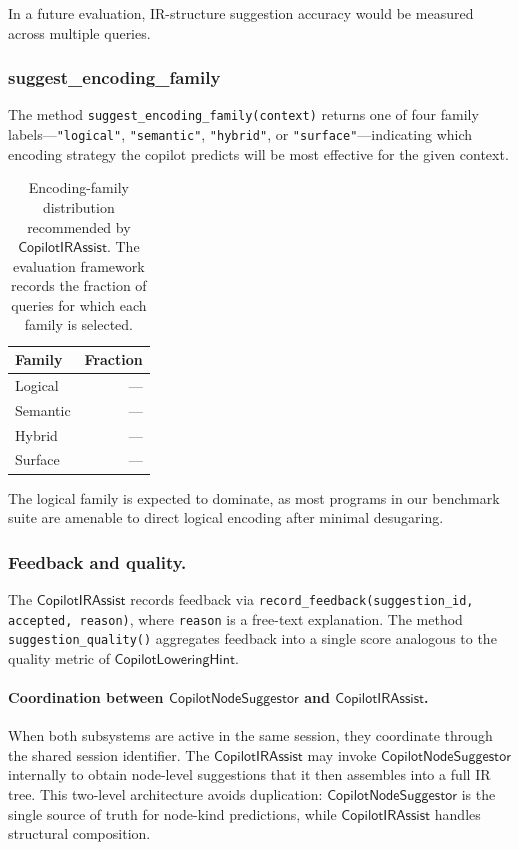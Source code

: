 \documentclass[11pt]{article}
\newcommand{\CLH}{\mathsf{CopilotLoweringHint}}
\newcommand{\CNS}{\mathsf{CopilotNodeSuggestor}}
\newcommand{\CIA}{\mathsf{CopilotIRAssist}}
\begin{document}
In a future evaluation, IR-structure suggestion accuracy would be
measured across multiple queries.

\subsubsection{suggest\_encoding\_family}\label{sec:enc-family}

The method \texttt{suggest\_encoding\_family(context)} returns one of
four family labels---\texttt{"logical"}, \texttt{"semantic"},
\texttt{"hybrid"}, or \texttt{"surface"}---indicating which encoding
strategy the copilot predicts will be most effective for the given
context.

\begin{table}[t]
\centering
\caption{Encoding-family distribution recommended by $\CIA$.
  The evaluation framework records the fraction of queries for which
  each family is selected.}
\label{tab:enc-family}
\begin{tabular}{l r}
\hline
\textbf{Family} & \textbf{Fraction} \\
\hline
Logical  & --- \\
Semantic & --- \\
Hybrid   & --- \\
Surface  & --- \\
\hline
\end{tabular}
\end{table}

The logical family is expected to dominate, as
most programs in our benchmark suite are
amenable to direct logical encoding after minimal desugaring.

\subsubsection{Feedback and quality.}
The $\CIA$ records feedback via
\texttt{record\_feedback(suggestion\_id, accepted, reason)}, where
\texttt{reason} is a free-text explanation.  The method
\texttt{suggestion\_quality()} aggregates feedback into a single score
analogous to the quality metric of $\CLH$.

\paragraph{Coordination between $\CNS$ and $\CIA$.}
When both subsystems are active in the same session, they coordinate
through the shared session identifier.  The $\CIA$ may invoke $\CNS$
internally to obtain node-level suggestions that it then assembles into
a full IR tree.  This two-level architecture avoids duplication:
$\CNS$ is the single source of truth for node-kind predictions, while
$\CIA$ handles structural composition.
\end{document}
